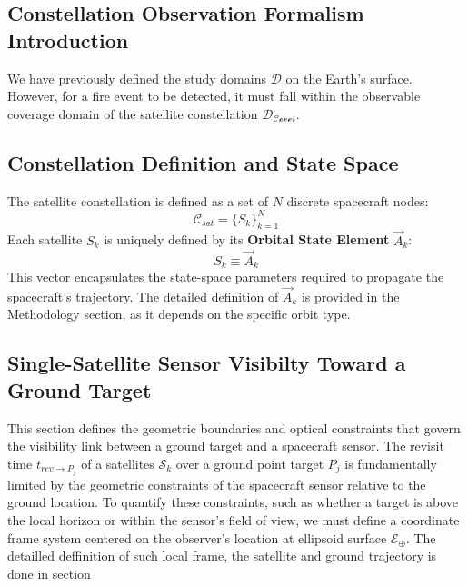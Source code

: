 \begin{table}[ht]
{\begin{itemize}
\section{Constellation Observation Formalism Introduction}
\label{sec:Constellation_observation_form}
We have previously defined the study domains $\mathcal{D}$ on the Earth's surface. However, for a fire event to be detected, it must fall within the observable coverage domain of the satellite constellation $\mathcal{D_{Cover}}$.  

\subsection{Constellation Definition and State Space}
The satellite constellation is defined as a set of $N$ discrete spacecraft nodes:
\begin{equation}
    \mathcal{C}_{sat} = \{ S_k \}_{k=1}^{N}
\end{equation}
Each satellite $S_k$ is uniquely defined by its \textbf{Orbital State Element} $\vec{A}_k$:
\begin{equation}
    S_{k} \equiv \vec{A}_k
\end{equation}
This vector encapsulates the state-space parameters required to propagate the spacecraft's trajectory. The detailed definition of $\vec{A}_k$ is provided in the Methodology section, as it depends on the specific orbit type.


\subsection{Single-Satellite Sensor Visibilty Toward a Ground Target}
This section defines the geometric boundaries and optical constraints that govern the visibility link between a ground target and a spacecraft sensor. The revisit time $t_{rev \to P_j}$ of a satellites $\mathcal{S}_{k}$ over a ground point target $P_{j}$ is fundamentally limited by the geometric constraints of the spacecraft sensor relative to the ground location. To quantify these constraints, such as whether a target is above the local horizon or within the sensor's field of view, we must define a coordinate frame system centered on the observer's location at ellipsoid surface $\mathcal{E_\oplus}$.  The detailled deffinition of such local frame, the satellite and ground trajectory is done in section 


\end{itemize}}
\end{table}
